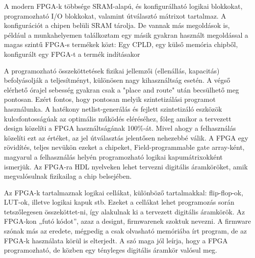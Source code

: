 \documentclass[a4paper,12pt,oneside]{book}
\begin{document}
A modern FPGA-k többsége SRAM-alapú, és konfigurálható logikai blokkokat, programozható I/O blokkokat, valamint útválasztó mátrixot tartalmaz. A konfigurációt a chipen belüli SRAM tárolja. De vannak más megoldások is, például a munkahelyemen találkoztam egy másik gyakran használt megoldással a magas szintű FPGA-s termékek közt: Egy CPLD, egy külső memória chipből, konfigurált egy FPGA-t a termék indításakor

A programozható összeköttetések fizikai jellemzői (ellenállás, kapacitás) befolyásolják a teljesítményt, különösen nagy kihasználtság esetén. A végső elérhető órajel sebesség gyakran csak a "place and route" után becsülhető meg pontosan. Ezért fontos, hogy pontosan melyik szintetizálási programot használunka. A hatékony netlist-generálás és fejlett szintetizáló eszközök kulcsfontosságúak az optimális működés eléréséhez, föleg amikor a tervezett design közelíti a FPGA használtságának 100\%-át. Mivel ahogy a felhasználás közelíti ezt az értéket, az jel útválasztás jelentősen nehezebbé válik.%
\iffalse
A FPGA egy rövidítés, teljes nevükön ezeket a chipeket, Field-programmable gate array-ként, magyarul a felhasználás helyén programozható logikai kapumátrixokként ismerjük. Az FPGA-ra HDL nyelveken lehet tervezni digitális áramköröket, amik megvalósulnak fizikailag a chip belsejében. 

Az FPGA-k tartalmaznak logikai cellákat, különböző tartalmakkal: flip-flop-ok, LUT-ok, illetve logikai kapuk stb. Ezeket a cellákat lehet programozás során tetszőlegesen összeköttet-ni, így alakulnak ki a tervezett digitális áramkörök. Az FPGA-kon „futó kódot”, azaz a designt, firmwarenek szoktuk nevezni. A firmware szónak más az eredete, mégpedig a csak olvasható memóriába írt program, de az FPGA-k használata körül is elterjedt. A szó maga jól leírja, hogy a FPGA programozható, de közben egy tényleges digitális áramkör valósul meg.
\end{document}
